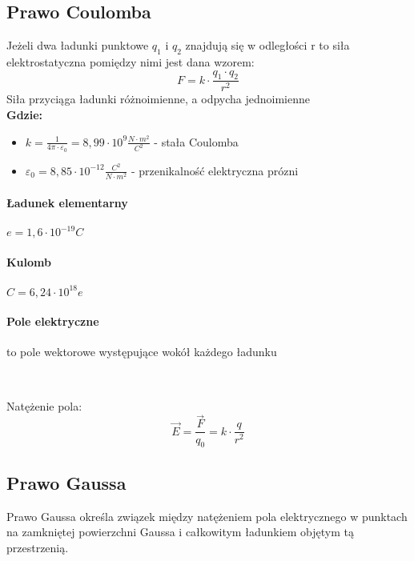 \documentclass{article}
\begin{document}
        \subsection{Prawo Coulomba}
            Jeżeli dwa ładunki punktowe $q_1$ i $q_2$ znajdują się
            w odległości r to siła elektrostatyczna pomiędzy nimi jest
            dana wzorem:
            \begin{equation}
                F = k \cdotp \frac{q_1 \cdotp q_2}{r^2}
            \end{equation} 
            Siła przyciąga ładunki różnoimienne, a odpycha jednoimienne
        \\
        \textbf{Gdzie:}
        \begin{itemize}
            \item $k = \frac{1}{4 \pi \cdotp \varepsilon_0} = 
            8,99 \cdotp 10^9 \frac{N \cdotp m^2}{C^2}$
            - stała Coulomba
        
            \item $\varepsilon_0 = 8,85 \cdotp 10^{-12} \frac{C^2}{N \cdotp m^2}$
            - przenikalność elektryczna prózni
        \end{itemize}
        
        \paragraph{Ładunek elementarny }
        $e = 1,6 \cdotp 10^{-19} C$
        \paragraph{Kulomb} 
        $C = 6,24 \cdotp 10^{18} e$

        \paragraph{Pole elektryczne }
        to pole wektorowe występujące wokół każdego ładunku

        \
        
        Natężenie pola: 
        \begin{equation}
            \vec{E} = \frac{\vec{F}}{q_0} = k \cdotp \frac{q}{r^2}    
        \end{equation}
        

        \subsection{Prawo Gaussa}
            Prawo Gaussa określa związek między natężeniem pola
            elektrycznego w punktach na zamkniętej powierzchni 
            Gaussa i całkowitym ładunkiem objętym tą przestrzenią.
            \
            
\end{document}

